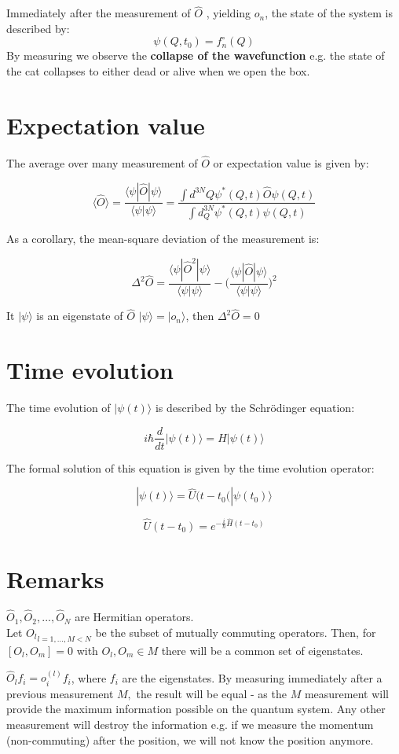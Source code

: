 Immediately after the measurement of $\hat{O}$ , yielding $o_n$, the state of the system is described by:
$$\psi(Q,t_0)=f_n^{\circ}(Q)$$
By measuring we observe the \textbf{collapse of the wavefunction} e.g. the state of the cat collapses to either dead or alive when we open the box.

\section{Expectation value}
The average over many measurement of $\hat{O}$ or expectation value is given by:

$$\langle \hat{O}\rangle = \frac{\langle\psi|\hat{O}|\psi\rangle}{\langle \psi|\psi\rangle}=\frac{\int d^{3 N} Q \psi^{*}(Q, t) \hat{O} \psi(Q, t)}{\int d_{Q}^{3 N} \psi^{*}(Q, t) \psi(Q, t)}$$

As a corollary,  the mean-square deviation of the measurement is:

$$\Delta^2\hat{O} = \frac{\langle \psi|\hat{O}^2|\psi\rangle}{\langle\psi|\psi\rangle}-\biggl(\frac{\langle\psi|\hat{O}|\psi\rangle}{\langle\psi|\psi\rangle}\biggr)^2$$

It $|\psi\rangle$ is an eigenstate of $\hat{O}$ $|\psi\rangle = |o_n\rangle$, then $\Delta^2\hat{O} = 0$

\section{Time evolution}
The time evolution of $|\psi(t)\rangle$ is described by the Schr\"odinger equation:

$$i\hbar \frac{d{}}{d{t}}|\psi(t)\rangle = H|\psi(t)\rangle$$

The formal solution of this equation is given by the time evolution operator:

$$|\psi(t)\rangle = \hat{U}(t-t_0(|\psi(t_0)\rangle$$

$$\hat{U}(t-t_0) = e^{-\frac{i}{\hbar}\hat{H}(t-t_0)}$$

\section{Remarks}
$\hat{O}_1,\hat{O}_2,...,\hat{O}_N$ are Hermitian operators.\\
Let ${O_l}_{l=1,...,M<N}$ be the subset of mutually commuting operators. Then, for $[O_l,O_m]=0$ with $O_l,O_m \in M$ there will be a common set of eigenstates.\\
\noindent

$\hat{O}_lf_i=o_i^{(l)}f_i$, where $f_i$ are the eigenstates.
By measuring immediately after a previous measurement $M,$ the result will be equal - as the $M$ measurement will provide the maximum information possible on the quantum system.
Any other measurement will destroy the information e.g. if we measure the momentum (non-commuting) after the position, we will not know the position anymore.

